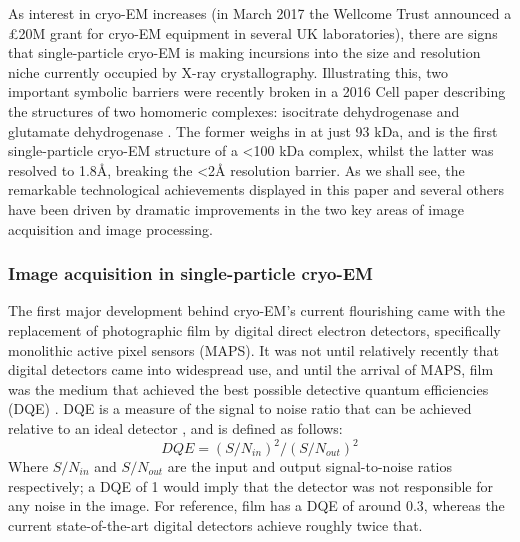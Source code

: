 \documentclass[a4paper,11pt,twoside,openright]{scrbook}
\begin{document}
As interest in cryo-EM increases (in March 2017 the Wellcome Trust announced a
£20M grant for cryo-EM equipment in several UK laboratories), there are signs
that single-particle cryo-EM is making incursions into the size and resolution
niche currently occupied by X-ray crystallography. Illustrating this, two
important symbolic barriers were recently broken in a 2016 Cell paper describing
the structures of two homomeric complexes: isocitrate dehydrogenase and
glutamate dehydrogenase \cite{Merk2016}. The former weighs in at just 93 kDa,
and is the first single-particle cryo-EM structure of a <100 kDa complex, whilst
the latter was resolved to 1.8Å, breaking the <2Å resolution barrier. As we
shall see, the remarkable technological achievements displayed in this paper and
several others have been driven by dramatic improvements in the two key areas of
image acquisition and image processing\cite{Bai2015}.

\subsubsection{Image acquisition in single-particle cryo-EM}
The first major development behind cryo-EM's current flourishing came with the
replacement of photographic film by digital direct electron detectors,
specifically monolithic active pixel sensors (MAPS). It was not until relatively
recently that digital detectors came into widespread use, and until the arrival
of MAPS, film was the medium that achieved the best possible detective quantum
efficiencies (DQE) \cite{McMullan2009}. DQE is a measure of the signal to noise
ratio that can be achieved relative to an ideal detector \cite{Dainty1975}, and
is defined as follows:
\begin{displaymath}
    DQE = (S/N_{in})^{2}/(S/N_{out})^{2}
\end{displaymath}
Where \begin{math} S/N_{in} \end{math} and \begin{math} S/N_{out} \end{math} are
the input and output signal-to-noise ratios respectively; a DQE of 1 would imply
that the detector was not responsible for any noise in the image. For reference,
film has a DQE of around 0.3, whereas the current state-of-the-art digital
detectors achieve roughly twice that.
\end{document}
